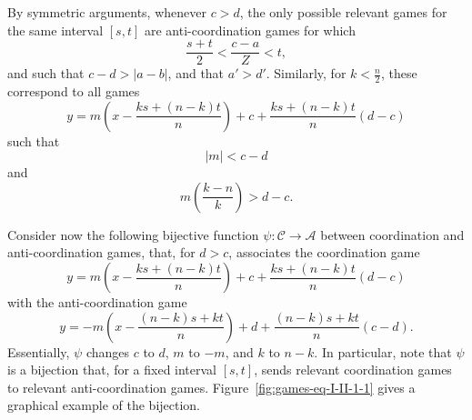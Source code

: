 \documentclass[fleqn,reqno,12pt]{article}
\theoremstyle{Satz}
\theoremstyle{Bsp}
\begin{document}
By symmetric arguments, whenever $c>d$, the only possible relevant
games for the same interval $[s,t]$ are anti-coordination games for
which 
\[
\frac{s+t}{2}<\frac{c-a}{Z}<t,
\]
and such that $c-d>|a-b|$, and that $a'>d'$. Similarly, for $k<\frac{n}{2}$,
these correspond to all games 
\[
y=m\left(x-\frac{ks+(n-k)t}{n}\right)+c+\frac{ks+(n-k)t}{n}(d-c)
\]
such that 
\[
|m|<c-d
\]
and 
\[
m\left(\frac{k-n}{k}\right)>d-c.
\]


Consider now the following bijective function $\psi:\mathcal{C}\rightarrow\mathcal{A}$
between coordination and anti-coordination games, that, for $d>c$,
associates the coordination game 
\[
y=m\left(x-\frac{ks+(n-k)t}{n}\right)+c+\frac{ks+(n-k)t}{n}(d-c)
\]
with the anti-coordination game
\[
y=-m\left(x-\frac{(n-k)s+kt}{n}\right)+d+\frac{(n-k)s+kt}{n}(c-d).
\]
Essentially, $\psi$ changes $c$ to $d$, $m$ to $-m$, and $k$
to $n-k$. In particular, note that $\psi$ is a bijection that, for
a fixed interval $[s,t]$, sends relevant coordination games to relevant
anti-coordination games. Figure~\ref{fig:games-eq-I-II-1-1} gives
a graphical example of the bijection.
\end{document}
